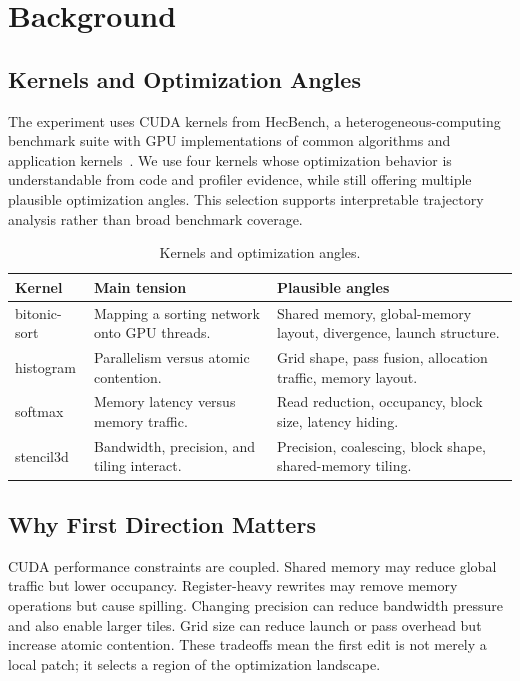 \documentclass[conference]{IEEEtran}
\begin{document}
\section{Background}

\subsection{Kernels and Optimization Angles}

The experiment uses CUDA kernels from HecBench, a heterogeneous-computing
benchmark suite with GPU implementations of common algorithms and application
kernels~\cite{hecbench}. We use four kernels whose optimization behavior is
understandable from code and profiler evidence, while still offering multiple
plausible optimization angles. This selection supports interpretable
trajectory analysis rather than broad benchmark coverage.

\begin{table}[t]
\centering
\caption{Kernels and optimization angles.}
\label{tab:kernels}
\scriptsize
\setlength{\tabcolsep}{2.5pt}
\begin{tabular}{@{}p{}p{}p{}@{}}
\toprule
\textbf{Kernel} & \textbf{Main tension} & \textbf{Plausible angles} \\
\midrule
bitonic-sort & Mapping a sorting network onto GPU threads. &
Shared memory, global-memory layout, divergence, launch structure. \\
histogram & Parallelism versus atomic contention. &
Grid shape, pass fusion, allocation traffic, memory layout. \\
softmax & Memory latency versus memory traffic. &
Read reduction, occupancy, block size, latency hiding. \\
stencil3d & Bandwidth, precision, and tiling interact. &
Precision, coalescing, block shape, shared-memory tiling. \\
\bottomrule
\end{tabular}
\end{table}

\subsection{Why First Direction Matters}

CUDA performance constraints are coupled. Shared memory may reduce global
traffic but lower occupancy. Register-heavy rewrites may remove memory
operations but cause spilling. Changing precision can reduce bandwidth pressure
and also enable larger tiles. Grid size can reduce launch or pass overhead but
increase atomic contention. These tradeoffs mean the first edit is not merely a
local patch; it selects a region of the optimization landscape.
\end{document}
